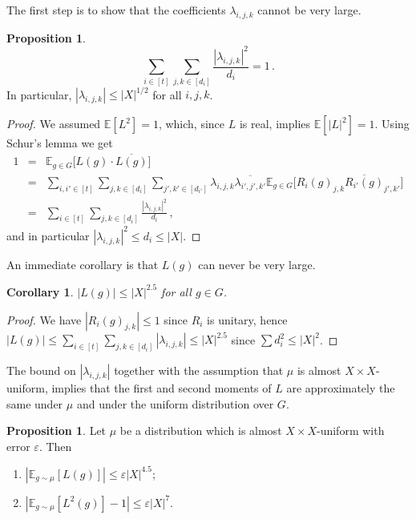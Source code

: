 \documentclass[10pt]{article}
\newtheorem{corollary}[theorem]{Corollary}
\theoremstyle{definition}
\newtheorem{proposition}[theorem]{Proposition}
\numberwithin{equation}{section}
\def\E{\mathbb{E}}
\def\eps{\varepsilon}
\begin{document}
The first step is to show that the
coefficients $\lambda_{i,j,k}$ cannot be very large.

\begin{proposition}\label{prop:bound_coefficients_lambda}\hspace{1mm}
\[
\sum_{i \in [t]}\sum_{j,k \in [d_i]} \frac{|\lambda_{i,j,k}|^2}{d_i} = 1\,.
\]
In particular, $|\lambda_{i,j,k}| \le |X|^{1/2}$ for all $i,j,k$.
\end{proposition}

\begin{proof}
We assumed $\E[L^2]=1$, which, since $L$ is
real, implies $\E[|L|^2]=1$. Using Schur's lemma we get
\begin{eqnarray*}
1 &=& \E_{g \in G}\bigl[L(g) \cdot \overline{L(g)}\bigr] \\
&=& \sum_{i,i' \in [t]} \sum_{j,k \in [d_i]} \sum_{j',k' \in [d_{i'}]}
\lambda_{i,j,k} \overline{\lambda_{i',j',k'}} \E_{g \in G}\bigl[R_i(g)_{j,k}
\overline{R_{i'}(g)}_{j',k'}\bigr]\\
& =& \sum_{i \in [t]} \sum_{j,k \in [d_i]} \frac{|\lambda_{i,j,k}|^2}{d_i}\,,
\end{eqnarray*}
and in particular $|\lambda_{i,j,k}|^2 \le d_i \le |X|$.
\end{proof}

An immediate corollary is that $L(g)$ can never be very large.

\begin{corollary}\label{cor:L_bound_infty}
$|L(g)| \le |X|^{2.5}$ for all $g \in G$.
\end{corollary}

\begin{proof}
We have $|R_i(g)_{j,k}| \le 1$ since $R_i$ is unitary, hence $|L(g)|
\le \sum_{i \in [t]} \sum_{j,k \in [d_i]} |\lambda_{i,j,k}|
\le |X|^{2.5}$ since $\sum d_i^2 \le |X|^2$.
\end{proof}

The bound on $|\lambda_{i,j,k}|$ together with the assumption
that $\mu$ is almost $X \times X$-uniform, implies that the first
and second moments of $L$ are approximately
the same under $\mu$ and under the uniform distribution over $G$.

\begin{proposition}\label{prop:L_moments_approx}
Let $\mu$ be a distribution which is
almost $X \times X$-uniform with error $\eps$. Then
\begin{enumerate}
\item $|\E_{g \sim \mu}[L(g)]| \le \eps |X|^{4.5}$;
\item $|\E_{g \sim \mu}[L^2(g)]-1| \le \eps |X|^7$.
\end{enumerate}
\end{proposition}
\end{document}
